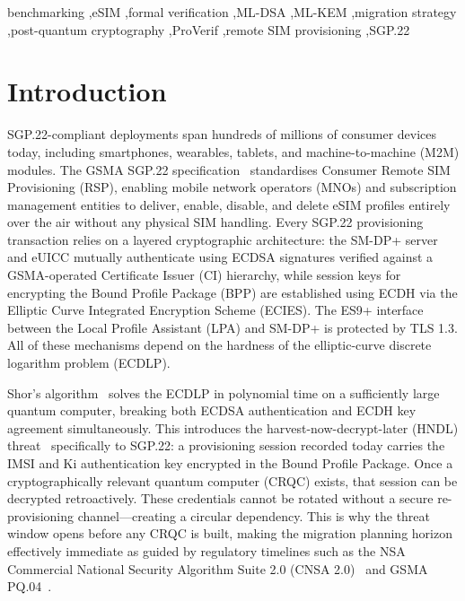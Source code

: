\documentclass[a4paper,fleqn]{cas-sc}
\begin{document}
\begin{keywords}
benchmarking \sep eSIM \sep formal verification \sep ML-DSA \sep ML-KEM \sep migration strategy \sep post-quantum cryptography \sep ProVerif \sep remote SIM provisioning \sep SGP.22
\end{keywords}

\maketitle

\section{Introduction}
\label{sec:introduction}

SGP.22-compliant deployments span hundreds of millions of consumer devices today,
including smartphones, wearables, tablets, and machine-to-machine (M2M) modules.
The GSMA SGP.22 specification~\cite{gsma_sgp22_v26} standardises Consumer Remote
SIM Provisioning (RSP), enabling mobile network operators (MNOs) and subscription
management entities to deliver, enable, disable, and delete eSIM profiles
entirely over the air without any physical SIM handling. Every SGP.22
provisioning transaction relies on a layered cryptographic architecture: the
SM-DP+ server and eUICC mutually authenticate using ECDSA signatures verified
against a GSMA-operated Certificate Issuer (CI) hierarchy, while session keys
for encrypting the Bound Profile Package (BPP) are established using ECDH via
the Elliptic Curve Integrated Encryption Scheme (ECIES). The ES9+ interface
between the Local Profile Assistant (LPA) and SM-DP+ is protected by TLS 1.3.
All of these mechanisms depend on the hardness of the elliptic-curve discrete
logarithm problem (ECDLP).

Shor's algorithm~\cite{shor1994algorithms} solves the ECDLP in polynomial time
on a sufficiently large quantum computer, breaking both ECDSA authentication
and ECDH key agreement simultaneously. This introduces the harvest-now-decrypt-later
(HNDL) threat~\cite{mosca2018cybersecurity} specifically to SGP.22: a provisioning
session recorded today carries the IMSI and Ki authentication key encrypted in the
Bound Profile Package. Once a cryptographically relevant quantum computer (CRQC)
exists, that session can be decrypted retroactively. These credentials cannot be
rotated without a secure re-provisioning channel---creating a circular dependency.
This is why the threat window opens before any CRQC is built, making the migration
planning horizon effectively immediate as guided by regulatory timelines such as
the NSA Commercial National Security Algorithm Suite 2.0 (CNSA 2.0)~\cite{nsa_cnsa2}
and GSMA PQ.04~\cite{gsma_pq04}.
\end{document}
